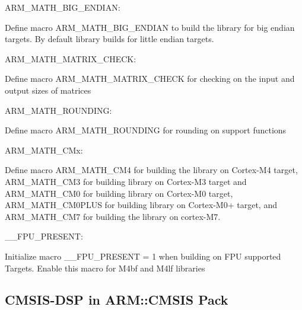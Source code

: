 \begin{DoxyItemize}
\item A\+R\+M\+\_\+\+M\+A\+T\+H\+\_\+\+B\+I\+G\+\_\+\+E\+N\+D\+I\+AN\+:
\end{DoxyItemize}

Define macro A\+R\+M\+\_\+\+M\+A\+T\+H\+\_\+\+B\+I\+G\+\_\+\+E\+N\+D\+I\+AN to build the library for big endian targets. By default library builds for little endian targets.


\begin{DoxyItemize}
\item A\+R\+M\+\_\+\+M\+A\+T\+H\+\_\+\+M\+A\+T\+R\+I\+X\+\_\+\+C\+H\+E\+CK\+:
\end{DoxyItemize}

Define macro A\+R\+M\+\_\+\+M\+A\+T\+H\+\_\+\+M\+A\+T\+R\+I\+X\+\_\+\+C\+H\+E\+CK for checking on the input and output sizes of matrices


\begin{DoxyItemize}
\item A\+R\+M\+\_\+\+M\+A\+T\+H\+\_\+\+R\+O\+U\+N\+D\+I\+NG\+:
\end{DoxyItemize}

Define macro A\+R\+M\+\_\+\+M\+A\+T\+H\+\_\+\+R\+O\+U\+N\+D\+I\+NG for rounding on support functions


\begin{DoxyItemize}
\item A\+R\+M\+\_\+\+M\+A\+T\+H\+\_\+\+C\+Mx\+:
\end{DoxyItemize}

Define macro A\+R\+M\+\_\+\+M\+A\+T\+H\+\_\+\+C\+M4 for building the library on Cortex-\/\+M4 target, A\+R\+M\+\_\+\+M\+A\+T\+H\+\_\+\+C\+M3 for building library on Cortex-\/\+M3 target and A\+R\+M\+\_\+\+M\+A\+T\+H\+\_\+\+C\+M0 for building library on Cortex-\/\+M0 target, A\+R\+M\+\_\+\+M\+A\+T\+H\+\_\+\+C\+M0\+P\+L\+US for building library on Cortex-\/\+M0+ target, and A\+R\+M\+\_\+\+M\+A\+T\+H\+\_\+\+C\+M7 for building the library on cortex-\/\+M7.


\begin{DoxyItemize}
\item \+\_\+\+\_\+\+F\+P\+U\+\_\+\+P\+R\+E\+S\+E\+NT\+:
\end{DoxyItemize}

Initialize macro \+\_\+\+\_\+\+F\+P\+U\+\_\+\+P\+R\+E\+S\+E\+NT = 1 when building on F\+PU supported Targets. Enable this macro for M4bf and M4lf libraries



 \subsection*{C\+M\+S\+I\+S-\/\+D\+SP in A\+R\+M\+::\+C\+M\+S\+IS Pack }

